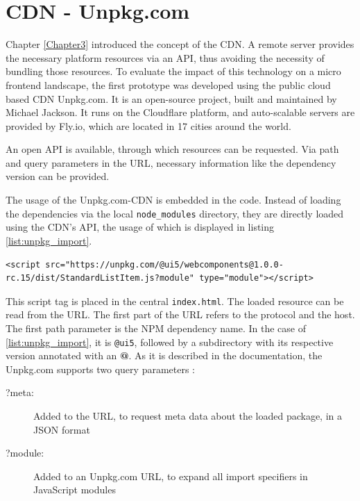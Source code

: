 \section{CDN - Unpkg.com} 

Chapter \ref{Chapter3} introduced the concept of the CDN. 
A remote server provides the necessary platform resources via an API, thus avoiding the necessity of bundling those resources.
To evaluate the impact of this technology on a micro frontend landscape, the first prototype was developed using the public cloud based CDN Unpkg.com. 
It is an open-source project, built and maintained by Michael Jackson. 
It runs on the Cloudflare platform, and auto-scalable servers are provided by Fly.io, which are located in 17 cities around the world.\cite{unpkg_doc}

An open API is available, through which resources can be requested. 
Via path and query parameters in the URL, necessary information like the dependency version can be provided.

The usage of the Unpkg.com-CDN is embedded in the code. 
Instead of loading the dependencies via the local \texttt{node\_modules} directory, they are directly loaded using the CDN's API, the usage of which is displayed in listing \ref{list:unpkg_import}.

\begin{lstlisting}[language=HTML5,caption=Import of a dependecy using the unpkg API, label=list:unpkg_import]
	<script src="https://unpkg.com/@ui5/webcomponents@1.0.0-rc.15/dist/StandardListItem.js?module" type="module"></script>
\end{lstlisting}

This script tag is placed in the central \texttt{index.html}. 
The loaded resource can be read from the URL. The first part of the URL refers to the protocol and the host. 
The first path parameter is the NPM dependency name. 
In the case of \ref{list:unpkg_import}, it is \texttt{@ui5}, followed by a subdirectory with its respective version annotated with an \textbf{@}.
As it is described in the documentation, the Unpkg.com supports two query parameters \cite{unpkg_doc}:

\begin{description}
	\item[?meta:] Added to the URL, to request meta data about the loaded package, in a JSON format
	\item[?module:] Added to an Unpkg.com URL, to expand all import specifiers in JavaScript modules
\end{description}

